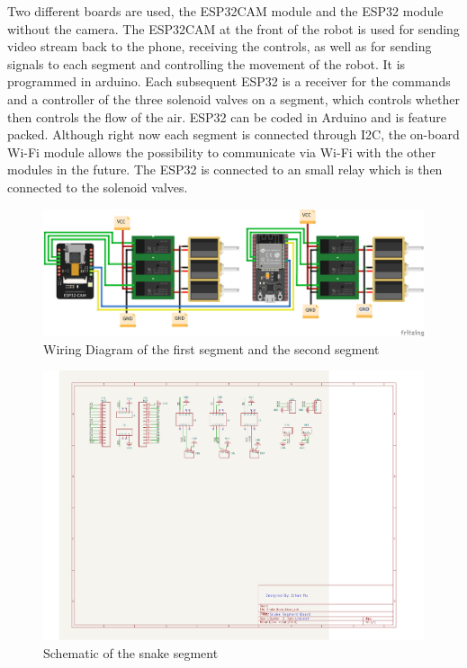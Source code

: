 \documentclass[twoside, 11pt]{article}
\begin{document}
Two different boards are used, the ESP32CAM module and the ESP32 module without the camera. The ESP32CAM at the front of the robot is used for sending video stream back to the phone, receiving the controls, as well as for sending signals to each segment and controlling the movement of the robot. It is programmed in arduino. Each subsequent ESP32 is a receiver for the commands and a controller of the three solenoid valves on a segment, which controls whether then controls the flow of the air. ESP32 can be coded in Arduino and is feature packed. Although right now each segment is connected through I2C, the on-board Wi-Fi module allows the possibility to communicate via Wi-Fi with the other modules in the future. The ESP32 is connected to an small relay which is then connected to the solenoid valves. 
\begin{figure} [H]
	\centering
	\includegraphics[width=0.75\linewidth]{wiring_diagram}
	\caption{Wiring Diagram of the first segment and the second segment}
\end{figure}

\begin{figure} [H]
\centering
	\includegraphics[width=\linewidth]{snake segment board circuit diagram}
	\caption{Schematic of the snake segment}
\end{figure}
\end{document}
